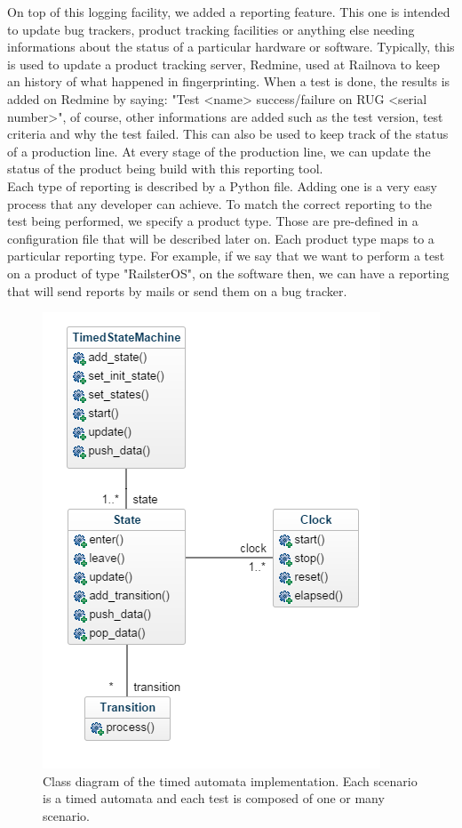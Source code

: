 \documentclass[12pt]{article}
\theoremstyle{definition}
\theoremstyle{definition}
\theoremstyle{remark}
\begin{document}
On top of this logging facility, we added a reporting feature. This one is intended to update bug trackers, product tracking facilities or anything else needing informations about the status of a particular hardware or software. Typically, this is used to update a product tracking server, Redmine, used at Railnova to keep an history of what happened in fingerprinting. When a test is done, the results is added on Redmine by saying: "Test <name> success/failure on RUG <serial number>", of course, other informations are added such as the test version, test criteria and why the test failed. This can also be used to keep track of the status of a production line. At every stage of the production line, we can update the status of the product being build with this reporting tool.\\

Each type of reporting is described by a Python file. Adding one is a very easy process that any developer can achieve. To match the correct reporting to the test being performed, we specify a product type. Those are pre-defined in a configuration file that will be described later on. Each product type maps to a particular reporting type. For example, if we say that we want to perform a test on a product of type "RailsterOS", on the software then, we can have a reporting that will send reports by mails or send them on a bug tracker.\\

\begin{figure}
    \centering
    \includegraphics[scale=0.8]{class_diagram.png}
    \caption{Class diagram of the timed automata implementation. Each scenario is a timed automata and each test is composed of one or many scenario.}
    \label{class_diagram}
\end{figure}
\end{document}

